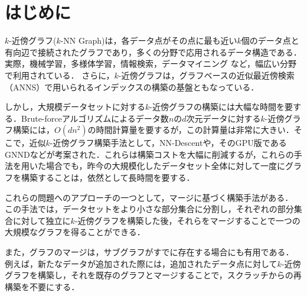 \documentclass[submit,techrep,noauthor]{ipsj}
\begin{document}
\maketitle

\section{はじめに}
$k$-近傍グラフ($k$-NN Graph)は，各データ点がその点に最も近い$k$個のデータ点と有向辺で接続されたグラフであり，多くの分野で応用されるデータ構造である．
実際，機械学習\cite{boiman_defense_2008,flores_analysis_2022}，多様体学習\cite{yan_graph_2007}，情報検索\cite{li_approximate_2020}，データマイニング \cite{brito_connectivity_1997}など，幅広い分野で利用されている．
さらに，$k$-近傍グラフは，グラフベースの近似最近傍検索（ANNS）で用いられるインデックスの構築の基盤ともなっている\cite{fu_fast_2019,ootomo_cagra_2024}．

しかし，大規模データセットに対する$k$-近傍グラフの構築には大幅な時間を要する．Brute-forceアルゴリズムによるデータ数$n$の$d$次元データに対する$k$-近傍グラフ構築には，$O(dn^2)$の時間計算量を要するが，この計算量は非常に大きい．そこで，近似$k$-近傍グラフ構築手法として，NN-Descent\cite{dong_efficient_2011}や，そのGPU版であるGNND\cite{wang_fast_2021}などが考案された．これらは構築コストを大幅に削減するが，これらの手法を用いた場合でも，昨今の大規模化したデータセット全体に対して一度にグラフを構築することは，依然として長時間を要する．

これらの問題へのアプローチの一つとして，マージに基づく構築手法がある．
この手法では，データセットをより小さな部分集合に分割し，それぞれの部分集合に対して独立に$k$-近傍グラフを構築した後，それらをマージすることで一つの大規模なグラフを得ることができる．

また，グラフのマージは，サブグラフがすでに存在する場合にも有用である．
例えば，新たなデータが追加された際には，追加されたデータ点に対して$k$-近傍グラフを構築し，それを既存のグラフとマージすることで，スクラッチからの再構築を不要にする．

\end{document}

